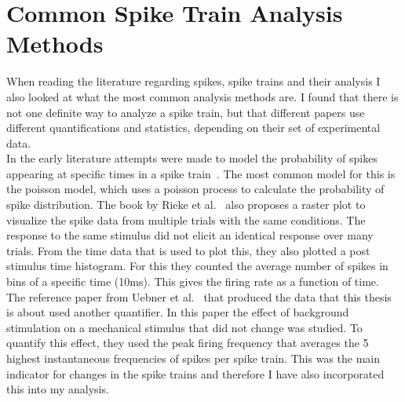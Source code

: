\section{Common Spike Train Analysis Methods}
When reading the literature regarding spikes, spike trains and their analysis I also looked at what the most common analysis methods are. I found that there is not one definite way to analyze a spike train, but that different papers use different quantifications and statistics, depending on their set of experimental data.\\
In the early literature attempts were made to model the probability of spikes appearing at specific times in a spike train~\cite{spikeGeneral}. The most common model for this is the poisson model, which uses a poisson process to calculate the probability of spike distribution.
The book by Rieke et al.~\cite{rieke1999spikes} also proposes a raster plot to visualize the spike data from multiple trials with the same conditions. The response to the same stimulus did not elicit an identical response over many trials. From the time data that is used to plot this, they also plotted a post stimulus time histogram. For this they counted the average number of spikes in bins of a specific time (10ms). This gives the firing rate as a function of time.\\
The reference paper from Uebner et al.~\cite{roberto} that produced the data that this thesis is about used another quantifier. In this paper the effect of background stimulation on a mechanical stimulus that did not change was studied. To quantify this effect, they used the peak firing frequency that averages the 5 highest instantaneous frequencies of spikes per spike train. This was the main indicator for changes in the spike trains and therefore I have also incorporated this into my analysis.


